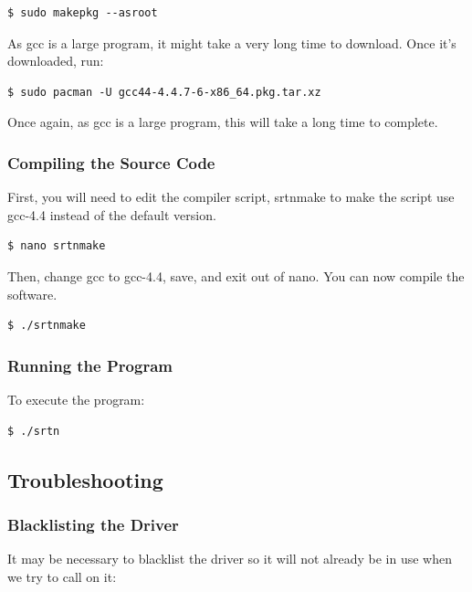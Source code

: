 \documentclass[11pt]{article} %
\begin{document}
\begin{lstlisting}[frame=single]
$ sudo makepkg --asroot
\end{lstlisting}

\noindent As gcc is a large program, it might take a very long time to download. Once it's downloaded, run:

\begin{lstlisting}[frame=single]
$ sudo pacman -U gcc44-4.4.7-6-x86_64.pkg.tar.xz
\end{lstlisting}

\noindent Once again, as gcc is a large program, this will take a long time to complete.

\subsubsection{Compiling the Source Code}

First, you will need to edit the compiler script, srtnmake to make the script use gcc-4.4 instead of the default version.

\begin{lstlisting}[frame=single]
$ nano srtnmake
\end{lstlisting}

\noindent Then, change gcc to gcc-4.4, save, and exit out of nano. You can now compile the software.

\begin{lstlisting}[frame=single]
$ ./srtnmake
\end{lstlisting}

\subsubsection{Running the Program}
To execute the program:

\begin{lstlisting}[frame=single]
$ ./srtn
\end{lstlisting}



\subsection{Troubleshooting}

\subsubsection{Blacklisting the Driver}

It may be necessary to blacklist the driver so it will not already be in use when we try to call on it:
\end{document}
